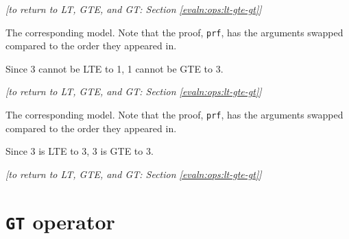     \begin{flushright}
        \textit{[to return to LT, GTE, and GT: Section \ref{evaln:ops:lt-gte-gt}]}
    \end{flushright}
    
    \newpage
    
    
    
    The corresponding \Idris model. Note that the proof, \texttt{prf}, has the arguments swapped compared to the order they appeared in.
    
    
    Since 3 cannot be LTE to 1, 1 cannot be GTE to 3.
    \\
    
    \begin{flushright}
        \textit{[to return to LT, GTE, and GT: Section \ref{evaln:ops:lt-gte-gt}]}
    \end{flushright}
    
    \newpage
    
    
    
    The corresponding \Idris model. Note that the proof, \texttt{prf}, has the arguments swapped compared to the order they appeared in.
    
    
    Since 3 is LTE to 3, 3 is GTE to 3.
    \\
    
    \begin{flushright}
        \textit{[to return to LT, GTE, and GT: Section \ref{evaln:ops:lt-gte-gt}]}
    \end{flushright}

\newpage


\section{\texttt{GT} operator}\label{app:evaln:ops:gt}
    
    
